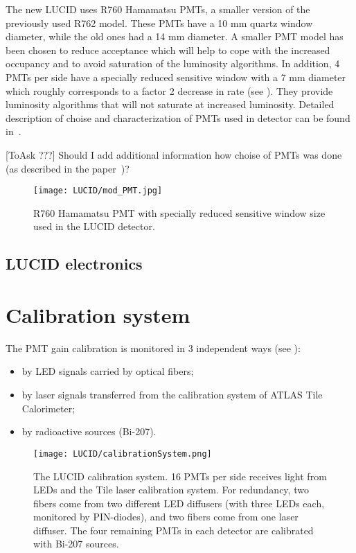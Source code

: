 The new LUCID uses R760 Hamamatsu PMTs, a smaller version of the previously used R762 model. These PMTs have a 
10 mm quartz window diameter, while the old ones had a 14 mm diameter. A smaller PMT model has been chosen to reduce acceptance 
which will help to cope with the increased occupancy and to avoid saturation of the luminosity algorithms.
In addition, 4 PMTs per side have a specially reduced sensitive window with a 7 mm diameter which roughly 
corresponds to a factor 2 decrease in rate (see ). They provide luminosity algorithms that will not saturate at 
increased luminosity. Detailed description of choise and characterization of PMTs used in detector can be found in~\cite{Alberghi:2016tad}.

[ToAsk ???] Should I add additional information how choise of PMTs was done (as described in the paper~\cite{Alberghi:2016tad})?

\begin{figure}
\centering
\texttt{[image: LUCID/mod\_PMT.jpg]}
\caption{R760 Hamamatsu PMT with specially reduced sensitive window size used in the LUCID detector.}
\label{fig:modPMT}
\end{figure}


\subsection{LUCID electronics}


\section{Calibration system}




The PMT gain calibration is monitored in 3 independent ways (see ):
\begin{itemize}
 \item by LED signals carried by optical fibers;
 \item by laser signals transferred from the calibration system of ATLAS Tile Calorimeter;
 \item by radioactive sources (Bi-207).
\end{itemize}

\begin{figure}
\centering
\texttt{[image: LUCID/calibrationSystem.png]}
\caption{The LUCID calibration system. 16 PMTs per side receives light from LEDs and the Tile laser calibration 
system. 
For redundancy, two fibers come from two different LED diffusers (with three LEDs each, monitored by 
PIN-diodes), and two fibers come from one laser diffuser. The four remaining PMTs in each detector are calibrated 
with Bi-207 sources.}
\label{fig:calibrationSystem}
\end{figure}

